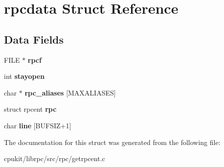 \hypertarget{structrpcdata}{}\section{rpcdata Struct Reference}
\label{structrpcdata}
\subsection*{Data Fields}
\begin{DoxyCompactItemize}
\item 
\mbox{\label{structrpcdata_a19c5f08101b57b2895dceda49f62362d}} 
F\+I\+LE $\ast$ {\bfseries rpcf}
\item 
\mbox{\label{structrpcdata_a6f39a700c0ec6ec21cee1bfc4bfd2c44}} 
int {\bfseries stayopen}
\item 
\mbox{\label{structrpcdata_a3111ff2da95054c0bd9b1e71a0487150}} 
char $\ast$ {\bfseries rpc\+\_\+aliases} \mbox{[}M\+A\+X\+A\+L\+I\+A\+S\+ES\mbox{]}
\item 
\mbox{\label{structrpcdata_abae684e618e1ce3067f607d7015a18b7}} 
struct rpcent {\bfseries rpc}
\item 
\mbox{\label{structrpcdata_aee5a9d0004e77c23be4ba2fa3cda040f}} 
char {\bfseries line} \mbox{[}B\+U\+F\+S\+IZ+1\mbox{]}
\end{DoxyCompactItemize}


The documentation for this struct was generated from the following file\+:\begin{DoxyCompactItemize}
\item 
cpukit/librpc/src/rpc/getrpcent.\+c\end{DoxyCompactItemize}
